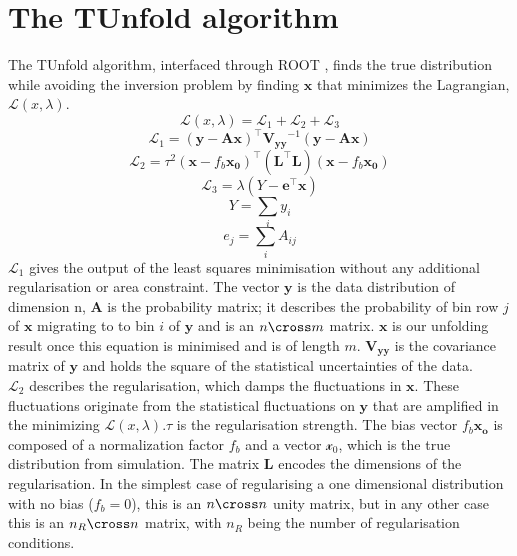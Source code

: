   \section{The TUnfold algorithm}
   The TUnfold algorithm, interfaced through ROOT \cite{root}, finds the true distribution while avoiding the inversion problem by finding $\mathbf{x}$ that minimizes the Lagrangian, $\mathcal{L}(x,\lambda)$.
 \begin{equation}
   \mathcal{L}(x, \lambda) = \mathcal{L}_1 + \mathcal{L}_2 + \mathcal{L}_3
 \end{equation}
  \begin{equation}
   \mathcal{L}_1 = (\mathbf{y}-\mathbf{A}\mathbf{x})^{\intercal}\mathbf{V_{yy}}^{-1} (\mathbf{y}-\mathbf{A}\mathbf{x})
 \end{equation}
  \begin{equation}
 \mathcal{L}_2 = \tau^2(\mathbf{x}-f_b\mathbf{x_0})^{\intercal}(\mathbf{L^{\intercal}L})(\mathbf{x}-f_b\mathbf{x_0})
 \end{equation}
  \begin{equation}
   \mathcal{L}_3 = \lambda(Y-\mathbf{e^{\intercal}x})
 \end{equation}
   \begin{equation}
     Y = \sum_iy_i
   \end{equation}
      \begin{equation}
     e_j = \sum_iA_{ij}
   \end{equation}
   $\mathcal{L}_1$ gives the output of the least squares minimisation without any additional regularisation or area constraint. The vector $\mathbf{y}$ is the data distribution of dimension n, $\mathbf{A}$ is the probability matrix; it describes the probability of bin row $j$ of $\mathbf{x}$ migrating to to bin $i$ of $\mathbf{y}$ and is an $n \cross m $ matrix. $\mathbf{x}$ is our unfolding result once this equation is minimised and is of length $m$. $\mathbf{V_{yy}}$ is the covariance matrix of $\mathbf{y}$ and holds the square of the statistical uncertainties of the data. \\
   $\mathcal{L}_2$ describes the regularisation, which damps the fluctuations in $\mathbf{x}$. These fluctuations originate from the statistical fluctuations on $\mathbf{y}$ that are amplified in the minimizing $\mathcal{L}(x, \lambda)$.$\tau$ is the regularisation strength. The bias vector $f_b\mathbf{x_o}$ is composed of a normalization factor $f_b$ and a vector $\mathcal{x_0}$, which is the true distribution from simulation. The matrix $\mathbf{L}$ encodes the dimensions of the regularisation. In the simplest case of regularising a one dimensional distribution with no bias ($f_b=0$), this is an $n\cross n$ unity matrix, but in any other case this is an $n_R \cross n$ matrix, with $n_R$ being the number of regularisation conditions. \\
